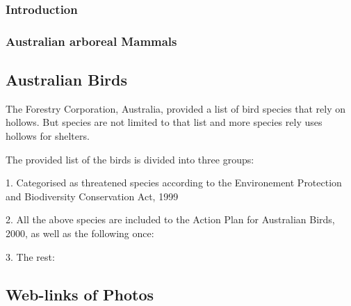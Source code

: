 \documentclass{subfiles}
\begin{document}
	
	\subsubsection{Introduction}
	
	\subsubsection{Australian arboreal Mammals}
	
	\subsection{Australian Birds}
	The Forestry Corporation, Australia, provided a list of bird species that rely on hollows. But species are not limited to that list and more species rely uses hollows for shelters.

	The provided list of the birds is divided into three groups:
	
	1. Categorised as threatened species according to the Environement Protection and Biodiversity Conservation Act, 1999
	
	
	2. All the above species are included to the Action Plan for Australian Birds, 2000, as well as the following once:
	
	
	3. The rest:
	
	
	
	
	
	\subsection{Web-links of Photos}
	
\end{document}
